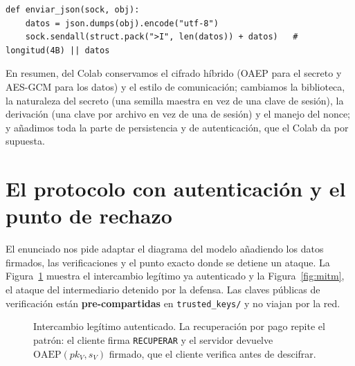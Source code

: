 \documentclass[11pt,a4paper]{article}
\newcommand{\codetag}[1]{\vspace{2pt}\noindent{\small\color{azulUNI}\textbf{#1}}\par\nobreak\vspace{1pt}}
\begin{document}
\codetag{Nuestro código (\texttt{crypto\_utils.py})}
\begin{lstlisting}
def enviar_json(sock, obj):
    datos = json.dumps(obj).encode("utf-8")
    sock.sendall(struct.pack(">I", len(datos)) + datos)   # longitud(4B) || datos
\end{lstlisting}

En resumen, del Colab conservamos el cifrado híbrido (OAEP para el secreto y
AES-GCM para los datos) y el estilo de comunicación; cambiamos la biblioteca, la
naturaleza del secreto (una semilla maestra en vez de una clave de sesión), la
derivación (una clave por archivo en vez de una de sesión) y el manejo del nonce;
y añadimos toda la parte de persistencia y de autenticación, que el Colab da por
supuesta.

\section{El protocolo con autenticación y el punto de rechazo}

El enunciado nos pide adaptar el diagrama del modelo añadiendo los datos firmados,
las verificaciones y el punto exacto donde se detiene un ataque. La
Figura~\ref{fig:legitimo} muestra el intercambio legítimo ya autenticado y la
Figura~\ref{fig:mitm}, el ataque del intermediario detenido por la defensa. Las
claves públicas de verificación están \textbf{pre-compartidas} en
\texttt{trusted\_keys/} y no viajan por la red.

\begin{figure}[h]\centering
{}
\caption{Intercambio legítimo autenticado. La recuperación por pago repite el
patrón: el cliente firma \texttt{RECUPERAR} y el servidor devuelve
$\mathrm{OAEP}(pk_V,s_V)$ firmado, que el cliente verifica antes de descifrar.}
\label{fig:legitimo}
\end{figure}
\end{document}
